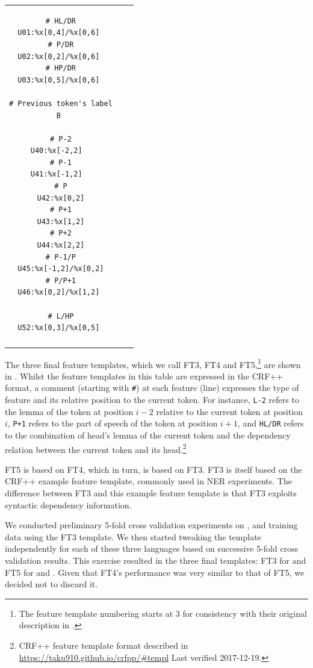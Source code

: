 \documentclass[output=paper,modfonts,nonflat]{langsci/langscibook}
\begin{document}
\begin{table}[p]
{\begin{tabular}{ccc}
\begin{minipage}[t]{3.6cm}
\begin{verbatim}
# HL/DR
U01:%x[0,4]/%x[0,6] 
# P/DR
U02:%x[0,2]/%x[0,6] 
# HP/DR
U03:%x[0,5]/%x[0,6] 

# Previous token's label
B 

# P-2
U40:%x[-2,2]  
# P-1
U41:%x[-1,2]  
# P
U42:%x[0,2]
# P+1
U43:%x[1,2]
# P+2
U44:%x[2,2]
# P-1/P
U45:%x[-1,2]/%x[0,2]
# P/P+1
U46:%x[0,2]/%x[1,2] 

# L/HP
U52:%x[0,3]/%x[0,5] 
\end{verbatim}
\end{minipage}\\
\lspbottomrule
  \end{tabular}
} 
\end{table}

The three final feature templates, which we call FT3, FT4 and FT5,\footnote{The feature template numbering starts at 3 for consistency with their original description in \cite{maldonado2017}.} are shown in . Whilst the feature templates in this table are expressed in the CRF++ format, a comment (starting with \texttt{\#}) at each feature (line) expresses the type of feature and its relative position to the current token. For instance, \texttt{L-2} refers to the lemma of the token at position $i-2$ relative to the current token at position~$i$, \texttt{P+1} refers to the part of speech of the token at position $i+1$, and \texttt{HL/DR} refers to the combination of head's lemma of the current token and the dependency relation between the current token and its head.\footnote{CRF++ feature template format described in \url{https://taku910.github.io/crfpp/#templ} Last verified 2017-12-19.}
 

FT5 is based on FT4, which in turn, is based on FT3. FT3 is itself based on the CRF++ example feature template, commonly used in NER experiments. The difference between FT3 and this example feature template is that FT3 exploits syntactic dependency information. 


We conducted preliminary 5-fold cross validation experiments on ,  and
 training data using the FT3 template. We then started tweaking the template independently for each of these three languages based on successive 5-fold cross validation results. This exercise resulted in the three final templates: FT3 for  and FT5 for  and . Given that FT4's performance was very similar to that of FT5, we decided not to discard it. 
\end{document}
